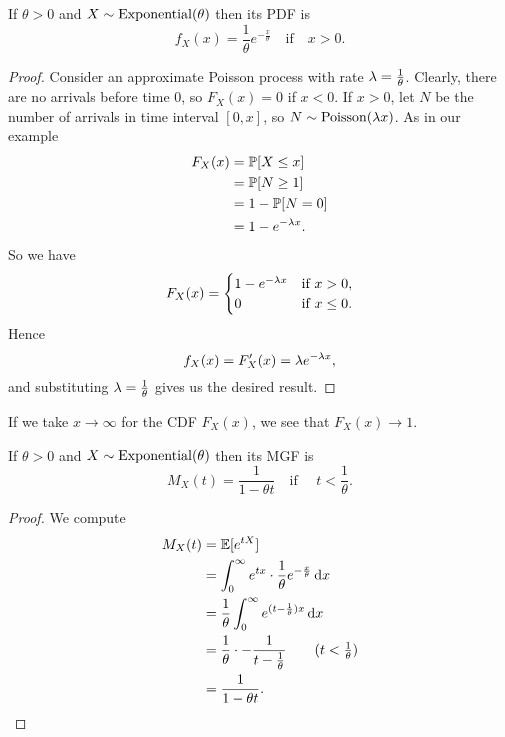 \documentclass[class=article, crop=false]{standalone}
\begin{document}
  \begin{theorem}{}
    If $\theta > 0$ and $X\sim \operatorname{Exponential}(\theta)$ then its PDF is
    \[
      f_X(x) = \frac{1}{\theta}e^{-\frac{x}{\theta}}\quad\text{if}\quad x > 0.
    \]
    \begin{proof}
      Consider an approximate Poisson process with rate $\lambda = \frac{1}{\theta}$. Clearly, there are no arrivals before time 0, so $F_X(x) = 0$ if $x < 0$. If $x > 0$, let $N$ be the number of arrivals in time interval $[0, x]$, so $N\sim \operatorname{Poisson}(\lambda x)$. As in our example
      \begin{align*}
        F_X(x) &= \mathbb{P}[X \leq x] \\
               &= \mathbb{P}[N \geq 1] \\
               &= 1 - \mathbb{P}[N = 0] \\
               &= 1 - e^{-\lambda x}.
      \end{align*}
      So we have
      \[
        F_X(x) = \begin{cases}
          1 - e^{-\lambda x} & \text{if } x > 0, \\
          0 & \text{if }x \leq 0.
        \end{cases}
      \]
      Hence
      \[
        f_X(x) = F_X'(x) = \lambda e^{-\lambda x},
      \]
      and substituting $\lambda = \frac{1}{\theta}$ gives us the desired result.
    \end{proof}
  \end{theorem}
  \begin{note}{}
    If we take $x\to\infty$ for the CDF $F_X(x)$, we see that $F_X(x)\to 1$.
  \end{note}
  \begin{theorem}{}
    If $\theta > 0$ and $X\sim \operatorname{Exponential}(\theta)$ then its MGF is
    \[
      M_X(t) = \frac{1}{1 - \theta t}\quad\text{if }\quad t <\frac{1}{\theta}.
    \]
    \begin{proof}
      We compute
      \begin{align*}
        M_X(t) &= \E[e^{tX}] \\
               &= \int_{0}^{\infty}e^{tx}\cdot \frac{1}{\theta}e^{-\frac{x}{\theta}} \,\mathrm dx \\
               &= \frac{1}{\theta} \int_{0}^{\infty}e^{(t - \frac{1}{\theta}) x} \,\mathrm dx \\
               &= \frac{1}{\theta}\cdot -\frac{1}{t - \frac{1}{\theta}} \tag{$t < \frac{1}{\theta}$} \\
               &= \frac{1}{1 - \theta t}.
      \end{align*}
    \end{proof}
  \end{theorem}
\end{document}
